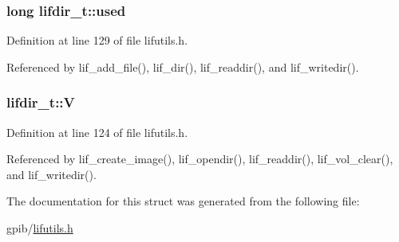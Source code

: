 \subsubsection[{\texorpdfstring{used}{used}}]{\setlength{\rightskip}{0pt plus 5cm}long lifdir\+\_\+t\+::used}\hypertarget{structlifdir__t_a20f303d91cccc01286974be1ee064a8f}{}\label{structlifdir__t_a20f303d91cccc01286974be1ee064a8f}


Definition at line 129 of file lifutils.\+h.



Referenced by lif\+\_\+add\+\_\+file(), lif\+\_\+dir(), lif\+\_\+readdir(), and lif\+\_\+writedir().

\subsubsection[{\texorpdfstring{V}{V}}]{ lifdir\+\_\+t\+::V}\hypertarget{structlifdir__t_a6d9cb52ec6e3ff579ca3f45db9176ce9}{}\label{structlifdir__t_a6d9cb52ec6e3ff579ca3f45db9176ce9}


Definition at line 124 of file lifutils.\+h.



Referenced by lif\+\_\+create\+\_\+image(), lif\+\_\+opendir(), lif\+\_\+readdir(), lif\+\_\+vol\+\_\+clear(), and lif\+\_\+writedir().



The documentation for this struct was generated from the following file\+:\begin{DoxyCompactItemize}
\item 
gpib/\hyperlink{lifutils_8h}{lifutils.\+h}\end{DoxyCompactItemize}
